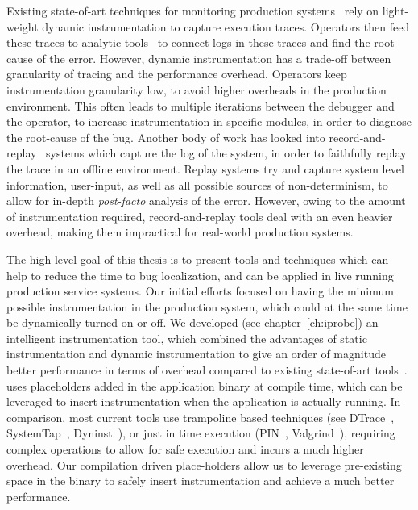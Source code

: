 Existing state-of-art techniques for monitoring production systems~\cite{dtrace,winetw,systemtap} rely on light-weight dynamic instrumentation to capture execution traces.
Operators then feed these traces to analytic tools~\cite{magpie,clue} to connect logs in these traces and find the root-cause of the error.
However, dynamic instrumentation has a trade-off between granularity of tracing and the performance overhead.
Operators keep instrumentation granularity low, to avoid higher overheads in the production environment.
This often leads to multiple iterations between the debugger and the operator, to increase instrumentation in specific modules, in order to diagnose the root-cause of the bug.
Another body of work has looked into record-and-replay~\cite{odr,revirt,laadan2010transparent,geels2007friday} systems which capture the log of the system, in order to faithfully replay the trace in an offline environment.
Replay systems try and capture system level information, user-input, as well as all possible sources of non-determinism, to allow for in-depth \textit{post-facto} analysis of the error.
However, owing to the amount of instrumentation required, record-and-replay tools deal with an even heavier overhead, making them impractical for real-world production systems.


The high level goal of this thesis is to present tools and techniques which can help to reduce the time to bug localization, and can be applied in live running production service systems. 
Our initial efforts focused on having the minimum possible instrumentation in the production system, which could at the same time be dynamically turned on or off. 
We developed \iprobe (see chapter~\ref{ch:iprobe}) an intelligent instrumentation tool, which combined the advantages of static instrumentation and dynamic instrumentation to give an order of magnitude better performance in terms of overhead compared to existing state-of-art tools~\cite{dtrace,systemtap,dyninst,pin}.
\iprobe uses placeholders added in the application binary at compile time, which can be leveraged to insert instrumentation when the application is actually running.
In comparison, most current tools use trampoline based techniques (see DTrace~\cite{dtrace}, SystemTap~\cite{systemtap}, Dyninst~\cite{dyninst}), or just in time execution (PIN~\cite{pin}, Valgrind~\cite{valgrind}), requiring complex operations to allow for safe execution and incurs a much higher overhead.
Our compilation driven place-holders allow us to leverage pre-existing space in the binary to safely insert instrumentation and achieve a much better performance.

